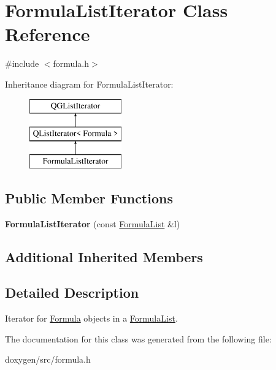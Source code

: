 \hypertarget{class_formula_list_iterator}{}\section{Formula\+List\+Iterator Class Reference}
\label{class_formula_list_iterator}


{\ttfamily \#include $<$formula.\+h$>$}

Inheritance diagram for Formula\+List\+Iterator\+:\begin{figure}[H]
\begin{center}
\leavevmode
\includegraphics[height=3.000000cm]{class_formula_list_iterator}
\end{center}
\end{figure}
\subsection*{Public Member Functions}
\begin{DoxyCompactItemize}
\item 
\mbox{\label{class_formula_list_iterator_a022a78cc64f3bc27df7cce6dcf98bb16}} 
{\bfseries Formula\+List\+Iterator} (const \mbox{\hyperlink{class_formula_list}{Formula\+List}} \&l)
\end{DoxyCompactItemize}
\subsection*{Additional Inherited Members}


\subsection{Detailed Description}
Iterator for \mbox{\hyperlink{class_formula}{Formula}} objects in a \mbox{\hyperlink{class_formula_list}{Formula\+List}}. 

The documentation for this class was generated from the following file\+:\begin{DoxyCompactItemize}
\item 
doxygen/src/formula.\+h\end{DoxyCompactItemize}
